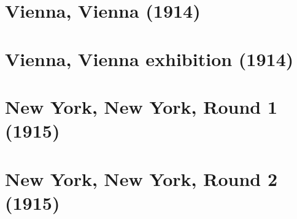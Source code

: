 \documentclass[11pt]{article}
\begin{document}
\clearpage



\clearpage



\clearpage



\clearpage



\clearpage



\clearpage



\clearpage



\clearpage



\clearpage



\clearpage

\section{Vienna, Vienna (1914)}


\clearpage



\clearpage

\section{Vienna, Vienna exhibition (1914)}


\clearpage



\clearpage

\section{New York, New York, Round 1 (1915)}


\clearpage

\section{New York, New York, Round 2 (1915)}


\clearpage
\end{document}
